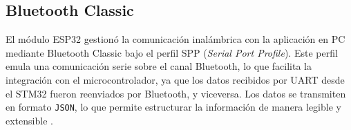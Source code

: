 \subsection{Bluetooth Classic}

El módulo ESP32 gestionó la comunicación inalámbrica con la aplicación en PC mediante Bluetooth Classic bajo el perfil SPP (\textit{Serial Port Profile}). Este perfil emula una comunicación serie sobre el canal Bluetooth, lo que facilita la integración con el microcontrolador, ya que los datos recibidos por UART desde el STM32 fueron reenviados por Bluetooth, y viceversa. Los datos se transmiten en formato \texttt{JSON}, lo que permite estructurar la información de manera legible y extensible \cite{spp_spec}.